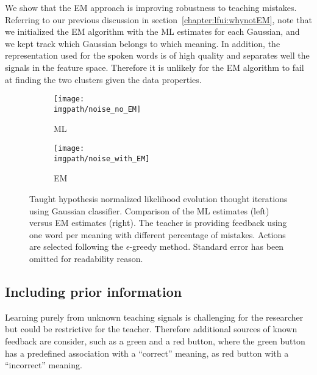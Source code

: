 
We show that the EM approach is improving robustness to teaching mistakes. Referring to our previous discussion in section~\ref{chapter:lfui:whynotEM}, note that we initialized the EM algorithm with the ML estimates for each Gaussian, and we kept track which Gaussian belongs to which meaning. In addition, the representation used for the spoken words is of high quality and separates well the signals in the feature space. Therefore it is unlikely for the EM algorithm to fail at finding the two clusters given the data properties.

\begin{figure}[!htbp]
  \centering
  \begin{subfigure}[b]{0.49\columnwidth}
    \centering
    \texttt{[image: \\imgpath/noise\_no\_EM]}
    \caption{ML}
  \end{subfigure}
  \begin{subfigure}[b]{0.49\columnwidth}
    \centering
    \texttt{[image: \\imgpath/noise\_with\_EM]}
    \caption{EM}
  \end{subfigure}
  \caption{Taught hypothesis normalized likelihood evolution thought iterations using Gaussian classifier. Comparison of the ML estimates (left) versus EM estimates (right). The teacher is providing feedback using one word per meaning with different percentage of mistakes. Actions are selected following the $\epsilon$-greedy method. Standard error has been omitted for readability reason.}
  \label{fig:Noise}
\end{figure}

\subsection{Including prior information}
\label{sec:IncludingPriorInformation}

Learning purely from unknown teaching signals is challenging for the researcher but could be restrictive for the teacher. Therefore additional sources of known feedback are consider, such as a green and a red button, where the green button has a predefined association with a ``correct'' meaning, as red button with a ``incorrect'' meaning. 


